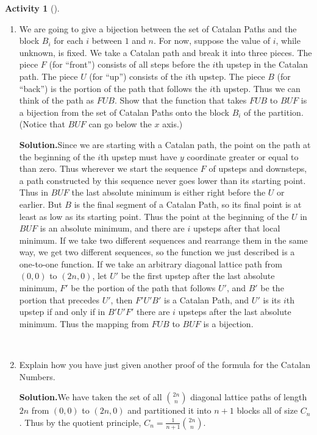 \documentclass[10pt,]{book}
\theoremstyle{plain}
\theoremstyle{definition}
\newtheorem{activity}[project]{Activity}
\numberwithin{equation}{chapter}
\begin{document}
\begin{activity}[]
\begin{enumerate}[label=(\alph*)]
~\par
\item We are going to give a bijection between the set of Catalan Paths and the block \(B_i\) for each \(i\) between \(1\) and \(n\).  For now, suppose the value of \(i\), while unknown, is fixed.  We take a Catalan path and break it into three pieces.  The piece \(F\) (for ``front'') consists of all steps before the \(i\)th upstep in the Catalan path.  The piece \(U\) (for ``up'') consists of the \(i\)th upstep.  The piece \(B\) (for ``back'') is the portion of the path that follows the \(i\)th upstep.  Thus we can think of the path as \(FUB\).  Show that the function that takes \(FUB\) to \(BUF\) is a bijection from the set of Catalan Paths onto the block \(B_i\) of the partition.  (Notice that \(BUF\) can go below the \(x\) axis.)%
\par\medskip\noindent%
\textbf{Solution.}\quad Since we are starting with a Catalan path, the point on the path at the beginning of the \(i\)th upstep must have \(y\) coordinate greater or equal to than zero. Thus wherever we start the sequence \(F\) of upsteps and downsteps, a path constructed by this sequence never goes lower than its starting point. Thus in \(BUF\) the last absolute minimum is either right before the \(U\) or earlier. But \(B\) is the final segment of a Catalan Path, so its final point is at least as low as its starting point. Thus the point at the beginning of the \(U\) in \(BUF\) is an absolute minimum, and there are \(i\) upsteps after that local minimum. If we take two different sequences and rearrange them in the same way, we get two different sequences, so the function we just described is a one-to-one function. If we take an arbitrary diagonal lattice path from \((0,0)\) to \((2n,0)\), let \(U'\) be the first upstep after the last absolute minimum, \(F'\) be the portion of the path that follows \(U'\), and \(B'\) be the portion that precedes \(U'\), then \(F'U'B'\) is a Catalan Path, and \(U'\) is its \(i\)th upstep if and only if in \(B'U'F'\) there are \(i\) upsteps after the last absolute minimum. Thus the mapping from \(FUB\) to \(BUF\) is a bijection.%

~\par
\item Explain how you have just given another proof of the formula for the Catalan Numbers.%
\par\medskip\noindent%
\textbf{Solution.}\quad We have taken the set of all \(\binom{2n}{n}\) diagonal lattice paths of length \(2n\) from \((0,0)\) to \((2n,0)\) and partitioned it into \(n+1\) blocks all of size \(C_n\). Thus by the quotient principle, \(C_n=\frac{1}{n+1}\binom{2n
}{n}\).%

\end{enumerate}
\end{activity}
\typeout{************************************************}
\typeout{************************************************}
\end{document}
